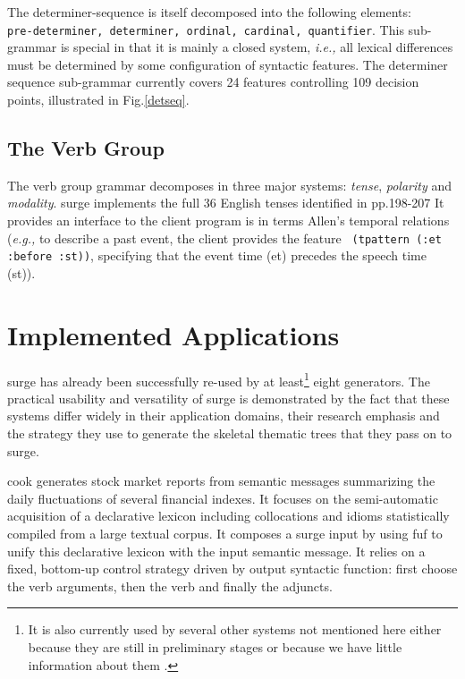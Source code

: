 The determiner-sequence is itself decomposed into the following elements:\\ 
{\tt pre-determiner, determiner, ordinal, cardinal, quantifier}.  This
sub-grammar is special in that it is mainly a closed system, {\em i.e.,}
all lexical differences must be determined by some configuration of
syntactic features.  The determiner sequence sub-grammar currently covers
24 features controlling 109 decision points, illustrated in
Fig.\ref{detseq}. 

\subsection{The Verb Group}

The verb group grammar decomposes in three major systems: {\em tense}, {\em
  polarity} and {\em modality}. {\sc surge} implements the full 36 English
tenses identified in \cite{halliday94} pp.198-207 It provides an interface
to the client program is in terms Allen's temporal relations \cite{allen83}
({\em e.g.,} to describe a past event, the client provides the feature {\tt
  (tpattern (:et :before :st))}, specifying that the event time (et)
precedes the speech time (st)).


\section{Implemented Applications}

{\sc surge} has already been successfully re-used by at least\footnote{It
  is also currently used by several other systems not mentioned here either
  because they are still in preliminary stages or because we have little
  information about them .} eight generators.  The practical usability and
versatility of {\sc surge} is demonstrated by the fact that these systems
differ widely in their application domains, their research emphasis and the
strategy they use to generate the skeletal thematic trees that they pass on
to {\sc surge}.

{\sc cook} \cite{smadja-ci} generates stock market reports from
  semantic messages summarizing the daily fluctuations of several financial
  indexes. It focuses on the semi-automatic acquisition of a declarative
  lexicon including collocations and idioms statistically compiled from a
  large textual corpus. It composes a {\sc surge} input by using {\sc fuf}
  to unify this declarative lexicon with the input semantic message. It
  relies on a fixed, bottom-up control strategy driven by output syntactic
  function: first choose the verb arguments, then the verb and finally the
  adjuncts.

